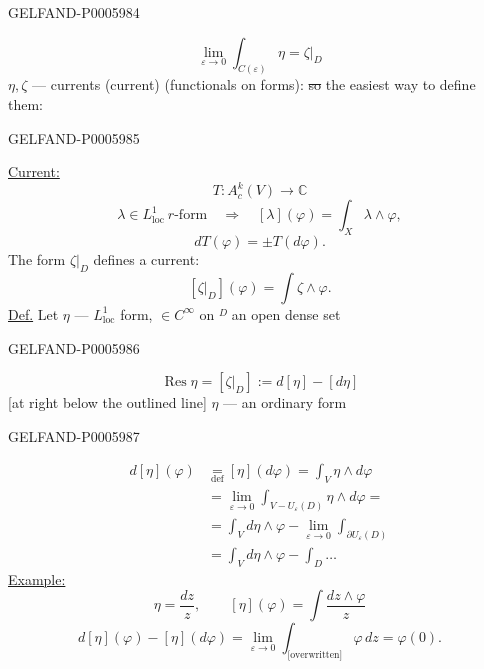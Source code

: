 \begin{GelfandAdjacentEvidence}{GELFAND-P000598}{4}

\[
\lim_{\varepsilon\to0}\int_{C(\varepsilon)}\eta=\zeta|_D
\]
\(\eta,\zeta\) — currents (current) (functionals on forms): \sout{so} the easiest way to define them:
\end{GelfandAdjacentEvidence}
\begin{GelfandAdjacentEvidence}{GELFAND-P000598}{5}


\underline{Current:}
\[
T:A_c^k(V)\to\mathbb C
\]
\[
\lambda\in L_{\mathrm{loc}}^1\ r\text{-form}\quad\Rightarrow\quad
[\lambda](\varphi)=\int_X\lambda\wedge\varphi,
\]
\[
dT(\varphi)=\pm T(d\varphi).
\]
The form \(\zeta|_D\) defines a current:
\[
[\zeta|_D](\varphi)=\int\zeta\wedge\varphi.
\]
\underline{Def.} Let \(\eta\) — \(L_{\mathrm{loc}}^1\) form,
\(\in C^\infty\) on \(\overset{D}{\phantom{.}}\) an open dense set
\end{GelfandAdjacentEvidence}
\begin{GelfandAdjacentEvidence}{GELFAND-P000598}{6}

\[
\operatorname{Res}\eta=[\zeta|_D]:=d[\eta]-[d\eta]
\]
[at right below the outlined line] \(\eta\) — an ordinary form
\end{GelfandAdjacentEvidence}
\begin{GelfandAdjacentEvidence}{GELFAND-P000598}{7}


\noindent{}\par
\[
\begin{aligned}
d[\eta](\varphi)&\underset{\mathrm{def}}{=}[\eta](d\varphi)
   =\int_V\eta\wedge d\varphi\\
&=\lim_{\varepsilon\to0}\int_{V-U_\varepsilon(D)}\eta\wedge d\varphi=\\
&=\int_V d\eta\wedge\varphi-\lim_{\varepsilon\to0}\int_{\partial U_\varepsilon(D)}\\
&=\int_V d\eta\wedge\varphi-\int_D\ldots
\end{aligned}
\]
\underline{Example:}
\[
\eta=\frac{dz}{z},\qquad [\eta](\varphi)=\int\frac{dz\wedge\varphi}{z}
\]
\[
d[\eta](\varphi)-[\eta](d\varphi)=
\lim_{\varepsilon\to0}\int_{\text{[overwritten]}}\varphi\,dz=\varphi(0).
\]
\end{GelfandAdjacentEvidence}
